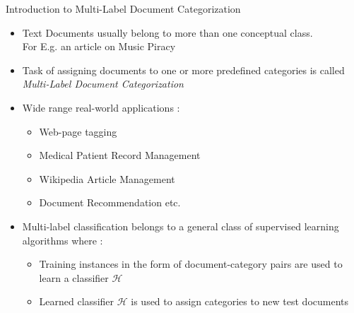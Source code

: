 \documentclass[10pt]{beamer}
\begin{document}
\begin{frame}{Introduction to Multi-Label Document Categorization}
\begin{itemize}
	\vfill\item<1-> Text Documents usually belong to more than one conceptual class. \\For E.g. an article on Music Piracy 
	\vfill\item<2-> Task of assigning documents to one or more predefined categories is called \emph{Multi-Label Document Categorization}
	\vfill\item<3-> Wide range real-world applications :
	\begin{itemize} 
	  \vfill\item<3-> Web-page tagging
	  \vfill\item<3-> Medical Patient Record Management
	  \vfill\item<3-> Wikipedia Article Management
	  \vfill\item<3-> Document Recommendation etc.
	\end{itemize} 
	\vfill\item<4-> Multi-label classification belongs to a general class of supervised learning algorithms where : 
	\begin{itemize}
	  \vfill\item<5-> Training instances in the form of document-category pairs are used to learn a classifier $\mathcal{H}$ 
	  \vfill\item<6-> Learned classifier $\mathcal{H}$ is used to assign categories to new test documents
	\end{itemize}
\end{itemize}
\vfill
\end{frame}

\end{document}
